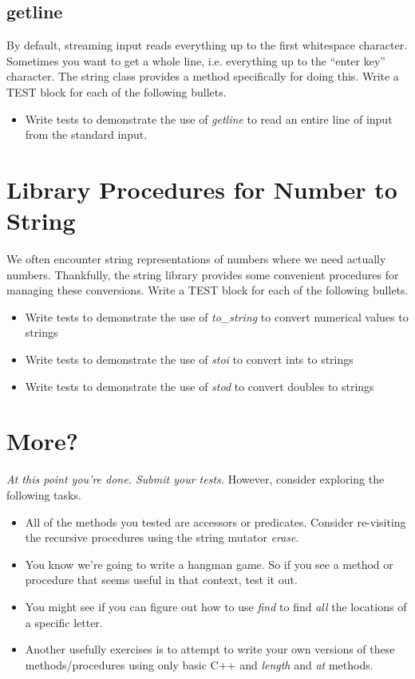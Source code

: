 \documentclass[]{tufte-handout}
\begin{document}
\subsection{	getline}

By default, streaming input reads everything up to the first whitespace character.  Sometimes you want to get a whole line, i.e. everything up to the ``enter key'' character.  The string class provides a method specifically for doing this.  Write a TEST block for each of the following bullets.
\begin{itemize}
\item Write tests to demonstrate the use of \textit{getline} to read an entire line of input from the standard input.
\end{itemize}


\section{Library Procedures for Number to String}

We often encounter string representations of numbers where we need actually numbers.  Thankfully, the string library provides some convenient procedures for managing these conversions. Write a TEST block for each of the following bullets.
\begin{itemize}
\item Write tests to demonstrate the use of \textit{to\_string} to convert numerical values to strings
\item Write tests to demonstrate the use of \textit{stoi} to convert ints to strings
\item Write tests to demonstrate the use of \textit{stod} to convert doubles to strings
\end{itemize}


\section{More?}

\textit{At this point you're done. Submit your tests.} However, consider exploring the following tasks.
\begin{itemize}
\item All of the methods you tested are accessors or predicates.  Consider re-visiting the recursive procedures using the string mutator \textit{erase}. 
\item You know we're going to write a hangman game.  So if you see a method or procedure that seems useful in that context, test it out.  
\item You might see if you can figure out how to use \textit{find} to find \textit{all} the locations of a specific letter.
\item Another usefully exercises is to attempt to write your own versions of these methods/procedures using only basic C++ and \textit{length} and \textit{at} methods.
\end{itemize}
\end{document}
